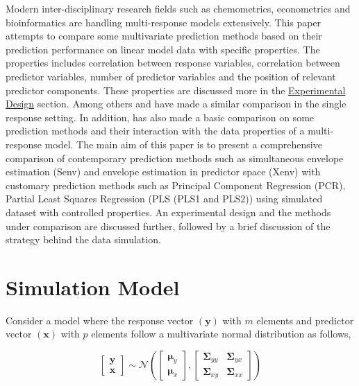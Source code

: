 \documentclass[12pt,3p,authoryear]{elsarticle}
\begin{document}
Modern inter-disciplinary research fields such as chemometrics,
econometrics and bioinformatics are handling multi-response models
extensively. This paper attempts to compare some multivariate prediction
methods based on their prediction performance on linear model data with
specific properties. The properties includes correlation between
response variables, correlation between predictor variables, number of
predictor variables and the position of relevant predictor components.
These properties are discussed more in the
\protect\hyperlink{experimental-design}{Experimental Design} section.
Among others \citet{saebo2015simrel} and \citet{Alm_y_1996} have made a
similar comparison in the single response setting. In addition,
\citet{Rimal2018} has also made a basic comparison on some prediction
methods and their interaction with the data properties of a
multi-response model. The main aim of this paper is to present a
comprehensive comparison of contemporary prediction methods such as
simultaneous envelope estimation (Senv) \citep{cook2015simultaneous} and
envelope estimation in predictor space (Xenv) \citep{cook2010envelope}
with customary prediction methods such as Principal Component Regression
(PCR), Partial Least Squares Regression (PLS \alert{(PLS1 and PLS2)})
using simulated dataset with controlled properties. An experimental
design and the methods under comparison are discussed further, followed
by a brief discussion of the strategy behind the data simulation.

\section{Simulation Model}\label{simulation-model}

Consider a model where the response vector \((\mathbf{y})\) with \(m\)
elements and predictor vector \((\mathbf{x})\) with \(p\) elements
follow a multivariate normal distribution as follows,

\begin{equation}
  \begin{bmatrix}
    \mathbf{y} \\ \mathbf{x}
  \end{bmatrix} \sim \mathcal{N}
  \left(
    \begin{bmatrix}
      \boldsymbol{\mu}_y \\
      \boldsymbol{\mu}_x
    \end{bmatrix},
    \begin{bmatrix}
    \boldsymbol{\Sigma}_{yy} & \boldsymbol{\Sigma}_{yx} \\
    \boldsymbol{\Sigma}_{xy} & \boldsymbol{\Sigma}_{xx}
    \end{bmatrix}
  \right)
  \label{eq:model-1}
\end{equation}
\end{document}

